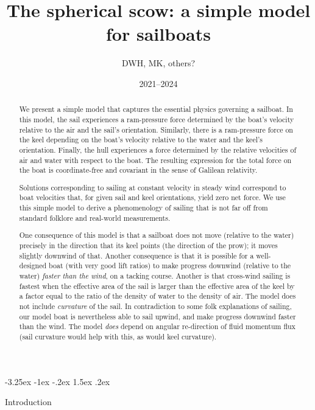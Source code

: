 \documentclass[letterpaper]{article}
\title{\bfseries%
The spherical scow: a simple model for sailboats}
\author{DWH, MK, others?}
\date{2021--2024}
\makeatletter
\renewcommand\section{\@startsection {section}{1}{\z@}%
  {-3.25ex \@plus -1ex \@minus -.2ex}%
  {1.5ex \@plus .2ex}%
  {\raggedright\normalfont\large\bfseries}}
\makeatother
\begin{document}
\maketitle

\begin{abstract}\noindent
    We present a simple model that captures the essential physics governing a sailboat. In this model, the sail experiences a ram-pressure force determined by the boat’s velocity relative to the air and the sail’s orientation. Similarly, there is a ram-pressure force on the keel depending on the boat’s velocity relative to the water and the keel’s orientation. Finally, the hull experiences a force determined by the relative velocities of air and water with respect to the boat.
    The resulting expression for the total force on the boat is coordinate-free and covariant in the sense of Galilean relativity.
    
    Solutions corresponding to sailing at constant velocity in steady wind correspond to boat velocities that,  for given sail and keel orientations, yield zero net force.
    We use this simple model to derive a phenomenology of sailing that is not far off from standard folklore and real-world measurements.
    
    One consequence of this model is that a sailboat does not move (relative to the water) precisely in the direction that its keel points (the direction of the prow); it moves slightly downwind of that.
    Another consequence is that it is possible for a well-designed boat (with very good lift ratios) to make progress downwind (relative to the water) \emph{faster than the wind}, on a tacking course.
    Another is that cross-wind sailing is fastest when the effective area of the sail is larger than the effective area of the keel by a factor equal to the ratio of the density of water to the density of air.
    The model does not include \emph{curvature} of the sail.  In contradiction to some folk explanations of sailing, our model boat is nevertheless able to sail upwind, and make progress downwind faster than the wind. The model \emph{does} depend on angular re-direction of fluid momentum flux (sail curvature would help with this, as would keel curvature).
\end{abstract}

\section{Introduction}\label{sec:intro}
\end{document}

